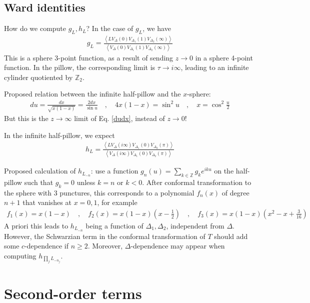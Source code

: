 \documentclass[12pt,a4paper]{article}
\begin{document}
\subsection{Ward identities}

How do we compute $g_L,h_L$? In the case of $g_L$, we have 
\begin{align}
 g_L = \frac{\left< LV_{\Delta}(0)V_{\Delta_1}(1)V_{\Delta_2}(\infty)\right>}{\left< V_{\Delta}(0)V_{\Delta_1}(1)V_{\Delta_2}(\infty)\right>}
\end{align}
This is a sphere 3-point function, as a result of sending $z\to 0$ in a sphere 4-point function. In the pillow, the corresponding limit is $\tau\to i\infty$, leading to an infinite cylinder quotiented by $\mathbb{Z}_2$. 

Proposed relation between the infinite half-pillow and the $x$-sphere:
\begin{align}
 du = \frac{dx}{\sqrt{x(1-x)}} = \frac{2dx}{\sin u} \quad , \quad 4x(1-x) = \sin^2u \quad , \quad x = \cos^2\tfrac{u}{2}
\end{align}
But this is the $z\to\infty$ limit of Eq. \eqref{dudx}, instead of $z\to 0$! 

In the infinite half-pillow, we expect
\begin{align}
 h_L = \frac{\left< LV_{\Delta}(i\infty)V_{\Delta_1}(0)V_{\Delta_2}(\pi)\right>}{\left< V_{\Delta}(i\infty)V_{\Delta_1}(0)V_{\Delta_2}(\pi)\right>}
\end{align}

Proposed calculation of $h_{L_{-n}}$: use a function $g_n(u)=\sum_{k\in\mathbb{Z}}g_k e^{iku} $ on the half-pillow such that $g_k=0$ unless $k=n$ or $k<0$. After conformal transformation to the sphere with 3 punctures, this corresponds to a polynomial $f_n(x)$ of degree $n+1$ that vanishes at $x=0,1$, for example 
\begin{align}
 f_1(x) = x(1-x) \quad , \quad f_2(x) = x(1-x)\left(x-\tfrac12\right) \quad ,\quad f_3(x) = x(1-x)\left(x^2-x+\tfrac{3}{16}\right)
\end{align}
A priori this leads to $h_{L_{-n}}$ being a function of $\Delta_1,\Delta_2$, independent from $\Delta$.
However, the Schwarzian term in the conformal transformation of $T$ should add some $c$-dependence if $n\geq 2$. Moreover, $\Delta$-dependence may appear when computing $h_{\prod_j L_{-n_j}}$. 

\section{Second-order terms}
\end{document}
